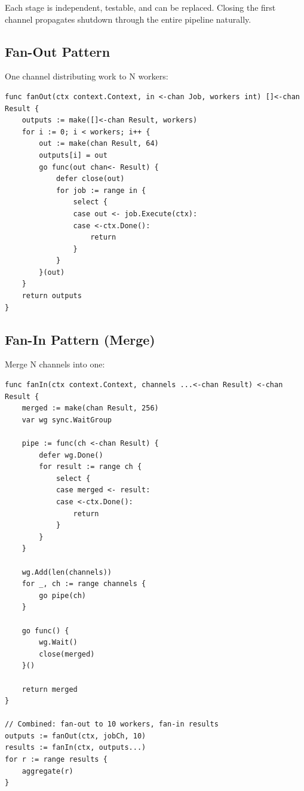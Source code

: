 \documentclass[11pt,a4paper,oneside]{book}
\begin{document}
Each stage is independent, testable, and can be replaced. Closing the
first channel propagates shutdown through the entire pipeline naturally.

\subsection{Fan-Out Pattern}

One channel distributing work to N workers:

\begin{verbatim}
func fanOut(ctx context.Context, in <-chan Job, workers int) []<-chan Result {
    outputs := make([]<-chan Result, workers)
    for i := 0; i < workers; i++ {
        out := make(chan Result, 64)
        outputs[i] = out
        go func(out chan<- Result) {
            defer close(out)
            for job := range in {
                select {
                case out <- job.Execute(ctx):
                case <-ctx.Done():
                    return
                }
            }
        }(out)
    }
    return outputs
}
\end{verbatim}

\subsection{Fan-In Pattern (Merge)}

Merge N channels into one:

\begin{verbatim}
func fanIn(ctx context.Context, channels ...<-chan Result) <-chan Result {
    merged := make(chan Result, 256)
    var wg sync.WaitGroup

    pipe := func(ch <-chan Result) {
        defer wg.Done()
        for result := range ch {
            select {
            case merged <- result:
            case <-ctx.Done():
                return
            }
        }
    }

    wg.Add(len(channels))
    for _, ch := range channels {
        go pipe(ch)
    }

    go func() {
        wg.Wait()
        close(merged)
    }()

    return merged
}

// Combined: fan-out to 10 workers, fan-in results
outputs := fanOut(ctx, jobCh, 10)
results := fanIn(ctx, outputs...)
for r := range results {
    aggregate(r)
}
\end{verbatim}
\end{document}
